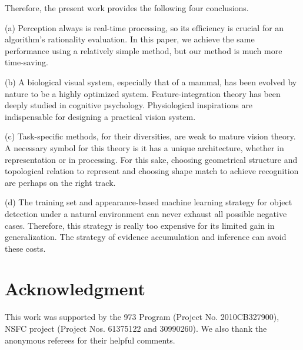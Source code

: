 \documentclass[journal]{IEEEtran}
\begin{document}
Therefore, the present work provides the following four conclusions.

(a) Perception always is real-time processing, so its efficiency is crucial for an algorithm's rationality evaluation. In this paper, we achieve the same performance using a relatively simple method, but our method is much more time-saving.

(b) A biological visual system, especially that of a mammal, has been evolved by nature to be a highly optimized system. Feature-integration theory has been deeply studied in cognitive psychology. Physiological inspirations are indispensable for designing a practical vision system.

(c) Task-specific methods, for their diversities, are weak to mature vision theory. A necessary symbol for this theory is it has a unique architecture, whether in representation or in processing. For this sake, choosing geometrical structure and topological relation to represent and choosing shape match to achieve recognition are perhaps on the right track.

(d) The training set and appearance-based machine learning strategy for object detection under a natural environment can never exhaust all possible negative cases. Therefore, this strategy is really too expensive for its limited gain in generalization. The strategy of evidence accumulation and inference can avoid these costs.



\section*{Acknowledgment}

This work was supported by the 973 Program (Project No. 2010CB327900), NSFC project (Project Nos. 61375122 and 30990260). We also thank the anonymous referees for their helpful comments.


\ifCLASSOPTIONcaptionsoff
  \newpage
\fi



\end{document}
